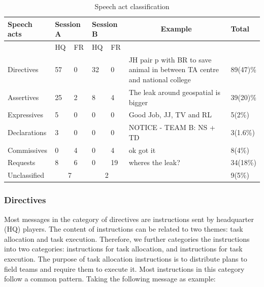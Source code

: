 \begin{table}[h]
\footnotesize
\begin{tabular}{lllllp{5cm}l}
Speech acts  & \multicolumn{2}{l}{Session A} & \multicolumn{2}{l}{Session B} & \multicolumn{1}{c}{Example} & Total    \\ \hline
             & HQ            & FR            & HQ            & FR            &                                                                            &          \\ \hline
Directives   & 57            & 0             & 32            & 0             & JH pair p with BR to save animal in between TA centre and national college & 89(47)\% \\
Assertives   & 25            & 2             & 8             & 4             &                                                                        The leak around geospatial is bigger & 39(20)\% \\
Expressives  & 5             & 0             & 0             & 0             &                                                                           Good Job, JJ, TV and RL & 5(2\%)   \\
Declarations & 3             & 0             & 0             & 0             &                                                                           NOTICE - TEAM B: NS + TD & 3(1.6\%) \\
Commissives  & 0             & 4             & 0             & 4             &                                                                           ok got it & 8(4\%)   \\
Requests     & 8             & 6             & 0             & 19            &                                                                           wheres the leak? & 34(18\%) \\
Unclassified & \multicolumn{2}{c}{7}         & \multicolumn{2}{c}{2}         &                                                                            & 9(5\%)  
\end{tabular}
\caption{Speech act classification}
\label{tab:speechact}
\end{table}

\subsubsection{Directives}

Most messages in the category of directives are instructions sent by headquarter (HQ) players. The content of instructions can be related to two themes: task allocation and task execution. Therefore, we further categories the instructions into two categories: instructions for task allocation, and instructions for task execution. The purpose of task allocation instructions is to distribute plans to field teams and require them to execute it. Most instructions in this category follow a common pattern. Taking the following message as example:\\

